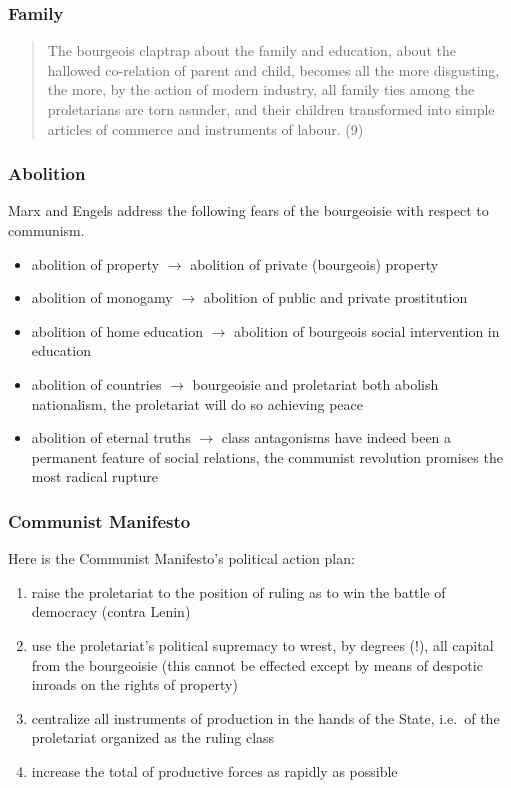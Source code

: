 \documentclass[xcolor=dvipsnames]{beamer}
\begin{document}
\begin{frame}
  \frametitle{Family}
  \begin{quote}
    The bourgeois claptrap about the family and education, about the
    hallowed co-relation of parent and child, becomes all the more
    disgusting, the more, by the action of modern industry, all family
    ties among the proletarians are torn asunder, and their children
    transformed into simple articles of commerce and instruments of
    labour. (9)
  \end{quote}
\end{frame}

\begin{frame}
  \frametitle{Abolition}
  Marx and Engels address the following fears of the bourgeoisie with
  respect to communism.
  \begin{itemize}
  \item abolition of property $\longrightarrow$ abolition of private
    (bourgeois) property
  \item abolition of monogamy $\longrightarrow$ abolition of public
    and private prostitution
  \item abolition of home education $\longrightarrow$ abolition of
    bourgeois social intervention in education
  \item abolition of countries $\longrightarrow$ bourgeoisie and
    proletariat both abolish nationalism, the proletariat will do so
    achieving peace
  \item abolition of eternal truths $\longrightarrow$ class
    antagonisms have indeed been a permanent feature of social
    relations, the communist revolution promises the most radical
    rupture
  \end{itemize}
\end{frame}

\begin{frame}
  \frametitle{Communist Manifesto}
  Here is the Communist Manifesto's political action plan:
  \begin{enumerate}
  \item raise the proletariat to the position of ruling as to win the
    battle of democracy (contra Lenin)
  \item use the proletariat's political supremacy to wrest, by degrees
    (!), all capital from the bourgeoisie (this cannot be effected
    except by means of despotic inroads on the rights of property)
  \item centralize all instruments of production in the hands of the
    State, i.e.\ of the proletariat organized as the ruling class
  \item increase the total of productive forces as rapidly as possible
  \end{enumerate}
\end{frame}
\end{document}
